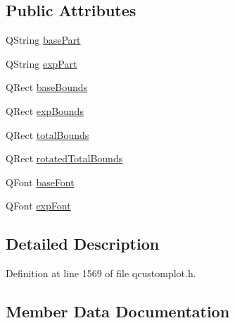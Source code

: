 \subsection*{Public Attributes}
\begin{DoxyCompactItemize}
\item 
Q\+String \hyperlink{struct_q_c_p_axis_painter_private_1_1_tick_label_data_ad65b76a5cafc412179a20b5d79809fc4}{base\+Part}
\item 
Q\+String \hyperlink{struct_q_c_p_axis_painter_private_1_1_tick_label_data_a09692e4ea092137278b4ac051d5fdf2b}{exp\+Part}
\item 
Q\+Rect \hyperlink{struct_q_c_p_axis_painter_private_1_1_tick_label_data_aac1047ae6ab8e9f5a42923082aabfff5}{base\+Bounds}
\item 
Q\+Rect \hyperlink{struct_q_c_p_axis_painter_private_1_1_tick_label_data_a6722d2bcefb93011e9dc42301b966846}{exp\+Bounds}
\item 
Q\+Rect \hyperlink{struct_q_c_p_axis_painter_private_1_1_tick_label_data_afbb3163cf4c628914f1b703945419ea5}{total\+Bounds}
\item 
Q\+Rect \hyperlink{struct_q_c_p_axis_painter_private_1_1_tick_label_data_aa4d38c5ea47c9184a78ee33ae7f1012e}{rotated\+Total\+Bounds}
\item 
Q\+Font \hyperlink{struct_q_c_p_axis_painter_private_1_1_tick_label_data_a0d4958a706debaa8d19a9b65fc090d56}{base\+Font}
\item 
Q\+Font \hyperlink{struct_q_c_p_axis_painter_private_1_1_tick_label_data_adc10767ebcb719d6927c012a38b9d933}{exp\+Font}
\end{DoxyCompactItemize}


\subsection{Detailed Description}


Definition at line 1569 of file qcustomplot.\+h.



\subsection{Member Data Documentation}
\hypertarget{struct_q_c_p_axis_painter_private_1_1_tick_label_data_aac1047ae6ab8e9f5a42923082aabfff5}{}
